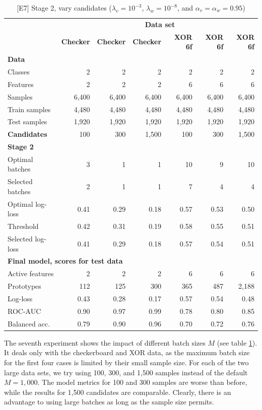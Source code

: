 \begin{table}
\caption{[E7] Stage 2, vary candidates ($\lambda_v=10^{-3}$, $\lambda_w=10^{-8}$, and $\alpha_v=\alpha_w=0.95$)}
\label{tab_e7}
%
\begin{center}
\small
\begin{tabular}{|lrrrrrr|}
\hline
&\multicolumn{6}{c|}{\textbf{\hrulefill\ Data set \hrulefill}}\\
&\textbf{Checker}&\textbf{Checker}&\textbf{Checker}&\textbf{XOR 6f}&\textbf{XOR 6f}&\textbf{XOR 6f}\\
\multicolumn{7}{|l|}{\textbf{Data}}\\
Classes&2&2&2&2&2&2\\
Features&2&2&2&6&6&6\\
Samples&6,400&6,400&6,400&6,400&6,400&6,400\\
Train samples&4,480&4,480&4,480&4,480&4,480&4,480\\
Test samples&1,920&1,920&1,920&1,920&1,920&1,920\\
\textbf{Candidates}&100&300&1,500&100&300&1,500\\
\multicolumn{7}{|l|}{\textbf{Stage 2}}\\
Optimal batches&3&1&1&10&9&10\\
Selected batches&2&1&1&7&4&4\\
Optimal log-loss&0.41&0.29&0.18&0.57&0.53&0.50\\
Threshold&0.42&0.31&0.19&0.58&0.55&0.51\\
Selected log-loss&0.41&0.29&0.18&0.57&0.54&0.51\\
\multicolumn{7}{|l|}{\textbf{Final model, scores for test data}}\\
Active features&2&2&2&6&6&6\\
Prototypes&112&125&300&365&487&2,188\\
Log-loss&0.43&0.28&0.17&0.57&0.54&0.48\\
ROC-AUC&0.90&0.97&0.99&0.78&0.80&0.85\\
Balanced acc.&0.79&0.90&0.96&0.70&0.72&0.76\\
\hline
\end{tabular}
\end{center}
\end{table}
%
The seventh experiment shows the impact of different batch sizes $M$ (see table \ref{tab_e7}).
It deals only with the checkerboard and XOR data, as the maximum batch size for the first four cases is limited by their small sample size.
For each of the two large data sets, we try using 100, 300, and 1,500 samples instead of the default $M=1,000$.
The model metrics for 100 and 300 samples are worse than before, while the results for 1,500 candidates are comparable.
Clearly, there is an advantage to using large batches as long as the sample size permits.
%
